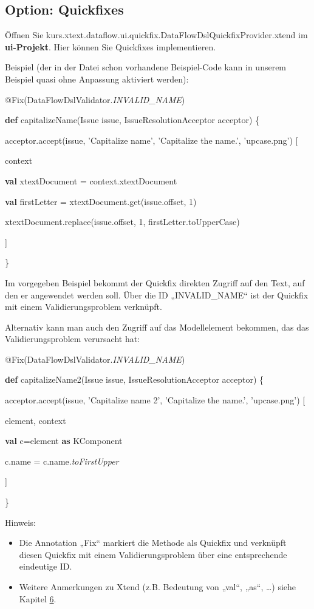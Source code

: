 \documentclass[]{article}
\providecommand{\tightlist}{%
  \setlength{\itemsep}{0pt}\setlength{\parskip}{0pt}}
\begin{document}
\subsection[Option:
Quickfixes]{\texorpdfstring{\protect\hypertarget{anchor-32}{}{}Option:
Quickfixes}{Option: Quickfixes}}\label{option-quickfixes}

Öffnen Sie
kurs.xtext.dataflow.ui.quickfix.DataFlowDslQuickfixProvider.xtend im
\textbf{ui-Projekt}. Hier können Sie Quickfixes implementieren.

Beispiel (der in der Datei schon vorhandene Beispiel-Code kann in
unserem Beispiel quasi ohne Anpassung aktiviert werden):

@Fix(DataFlowDslValidator.\emph{INVALID\_NAME})

\textbf{def} capitalizeName(Issue issue, IssueResolutionAcceptor
acceptor) \{

acceptor.accept(issue, 'Capitalize name', 'Capitalize the name.',
'upcase.png') {[}

context \textbar{}

\textbf{val} xtextDocument = context.xtextDocument

\textbf{val} firstLetter = xtextDocument.get(issue.offset, 1)

xtextDocument.replace(issue.offset, 1, firstLetter.toUpperCase)

{]}

\}

Im vorgegeben Beispiel bekommt der Quickfix direkten Zugriff auf den
Text, auf den er angewendet werden soll. Über die ID „INVALID\_NAME``
ist der Quickfix mit einem Validierungsproblem verknüpft.

Alternativ kann man auch den Zugriff auf das Modellelement bekommen, das
das Validierungsproblem verursacht hat:

@Fix(DataFlowDslValidator.\emph{INVALID\_NAME})

\textbf{def} capitalizeName2(Issue issue, IssueResolutionAcceptor
acceptor) \{

acceptor.accept(issue, 'Capitalize name 2', 'Capitalize the name.',
'upcase.png') {[}

element, context \textbar{}

\textbf{val} c=element \textbf{as} KComponent

c.name = c.name.\emph{toFirstUpper}

{]}

\}

Hinweis:

\begin{itemize}
\tightlist
\item
  Die Annotation „Fix`` markiert die Methode als Quickfix und verknüpft
  diesen Quickfix mit einem Validierungsproblem über eine entsprechende
  eindeutige ID.
\item
  Weitere Anmerkungen zu Xtend (z.B. Bedeutung von „val``, „as``,
  \ldots{}) siehe Kapitel \protect\hyperlink{anchor-33}{6}.
\end{itemize}
\end{document}

